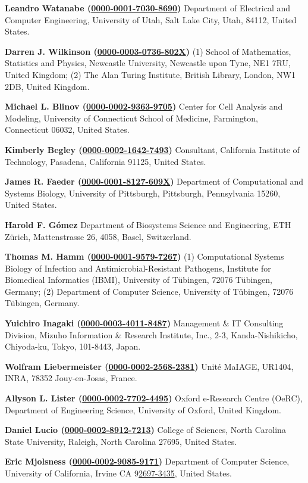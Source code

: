 \documentclass{sbml-paper}
\newcommand{\orcid}[1]{\href{https://orcid.org/#1}{#1}}
\begin{document}
\textbf{Leandro Watanabe (\orcid{0000-0001-7030-8690})} Department of Electrical and Computer Engineering,  University of Utah, Salt Lake City, Utah, 84112, United States.

\textbf{Darren J. Wilkinson (\orcid{0000-0003-0736-802X})} (1) School of Mathematics, Statistics and Physics, Newcastle University, Newcastle upon Tyne, NE1 7RU, United Kingdom; (2) The Alan Turing Institute, British Library, London, NW1 2DB, United Kingdom.

\textbf{Michael L. Blinov (\orcid{0000-0002-9363-9705})} Center for Cell Analysis and Modeling, University of Connecticut School of Medicine, Farmington, Connecticut 06032, United States.

\textbf{Kimberly Begley (\orcid{0000-0002-1642-7493})} Consultant, California Institute of Technology, Pasadena, California 91125, United States.

\textbf{James R. Faeder (\orcid{0000-0001-8127-609X})} Department of Computational and Systems Biology, University of Pittsburgh, Pittsburgh, Pennsylvania 15260, United States.

\textbf{Harold F. Gómez} Department of Biosystems Science and Engineering, ETH Zürich, Mattenstrasse 26, 4058, Basel, Switzerland.

\textbf{Thomas M. Hamm (\orcid{0000-0001-9579-7267})} (1) Computational Systems Biology of Infection and Antimicrobial-Resistant Pathogens, Institute for Biomedical Informatics (IBMI), University of Tübingen, 72076 Tübingen, Germany; (2) Department of Computer Science, University of Tübingen, 72076 Tübingen, Germany.

\textbf{Yuichiro Inagaki (\orcid{0000-0003-4011-8487})} Management \& IT Consulting Division, Mizuho Information \& Research Institute, Inc., 2-3, Kanda-Nishikicho, Chiyoda-ku, Tokyo, 101-8443, Japan.

\textbf{Wolfram Liebermeister (\orcid{0000-0002-2568-2381})} Unité MaIAGE, UR1404, INRA, 78352 Jouy-en-Josas, France.

\textbf{Allyson L. Lister (\orcid{0000-0002-7702-4495})} Oxford e-Research Centre (OeRC), Department of Engineering Science, University of Oxford, United Kingdom.

\textbf{Daniel Lucio (\orcid{0000-0002-8912-7213})} College of Sciences, North Carolina State University, Raleigh, North Carolina 27695, United States.

\textbf{Eric Mjolsness (\orcid{0000-0002-9085-9171})} Department of Computer Science, University of California, Irvine CA 9\orcid{2697-3435}, United States.
\end{document}
